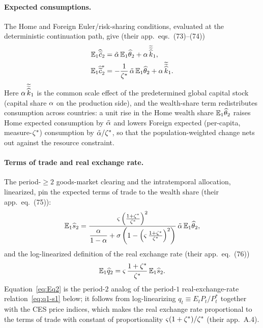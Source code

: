 \paragraph{Expected consumptions.} The Home and Foreign Euler/risk-sharing
conditions, evaluated at the deterministic continuation path, give (their
app.~eqs.~(73)--(74))
\begin{align}
\mathbb{E}_1\widehat{\widetilde{c}}_2 &= \tilde{\alpha}\,\mathbb{E}_1\widehat{\theta}_2 + \alpha\,\widetilde{\widetilde{\widehat{k}}}_1, \label{eq:Ec2}\\
\mathbb{E}_1\widehat{\widetilde{c}}^{*}_2 &= -\frac{1}{\zeta^{*}}\,\tilde{\alpha}\,\mathbb{E}_1\widehat{\theta}_2 + \alpha\,\widetilde{\widetilde{\widehat{k}}}_1. \label{eq:Ec2-star}
\end{align}
Here $\alpha\,\widetilde{\widetilde{\widehat{k}}}_1$ is the common scale effect of
the predetermined global capital stock (capital share $\alpha$ on the
production side), and the wealth-share term redistributes consumption across
countries: a unit rise in the Home wealth share $\mathbb{E}_1\widehat{\theta}_2$ raises Home
expected consumption by $\tilde{\alpha}$ and lowers Foreign expected (per-capita,
measure-$\zeta^{*}$) consumption by $\tilde{\alpha}/\zeta^{*}$, so that the population-weighted change
nets out against the resource constraint.

\paragraph{Terms of trade and real exchange rate.} The period-$\ge2$ goods-market
clearing and the intratemporal allocation, linearized, pin the expected terms of
trade to the wealth share (their app.~eq.~(75)):
\begin{equation}
\mathbb{E}_1\widehat{s}_2 = \frac{\varsigma\left(\frac{1+\zeta^{*}}{\zeta^{*}}\right)^2}
{\dfrac{\alpha}{1-\alpha}+\sigma\left(1-\left(\varsigma\,\frac{1+\zeta^{*}}{\zeta^{*}}\right)^2\right)}\,
\tilde{\alpha}\,\mathbb{E}_1\widehat{\theta}_2, \label{eq:Es2}
\end{equation}
and the log-linearized definition of the real exchange rate (their app.~eq.~(76))
\begin{equation}
\mathbb{E}_1\widehat{q}_2 = \varsigma\,\frac{1+\zeta^{*}}{\zeta^{*}}\,\mathbb{E}_1\widehat{s}_2. \label{eq:Eq2}
\end{equation}
Equation~\eqref{eq:Eq2} is the period-$2$ analog of the period-$1$ real-exchange-rate
relation~\eqref{eq:q1-s1} below; it follows from log-linearizing
$q_t\equiv E_tP_t/P^{*}_t$ together with the CES price indices, which makes the
real exchange rate proportional to the terms of trade with constant of
proportionality $\varsigma(1+\zeta^{*})/\zeta^{*}$ (their app.~A.4).

